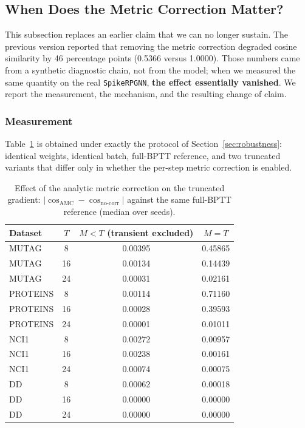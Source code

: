 \documentclass[a4paper,fleqn]{cas-dc}
\begin{document}
\subsection{When Does the Metric Correction Matter?}
\label{sec:when_mc_matters}

This subsection replaces an earlier claim that we can no longer sustain. The previous version reported that removing the metric correction degraded cosine similarity by 46 percentage points (0.5366 versus 1.0000). Those numbers came from a synthetic diagnostic chain, not from the model; when we measured the same quantity on the real \texttt{SpikeRPGNN}, \textbf{the effect essentially vanished}. We report the measurement, the mechanism, and the resulting change of claim.

\subsubsection{Measurement}

Table~\ref{tab:mc_ablation} is obtained under exactly the protocol of Section~\ref{sec:robustness}: identical weights, identical batch, full-BPTT reference, and two truncated variants that differ only in whether the per-step metric correction is enabled.

\begin{table}[htbp]
\caption{Effect of the analytic metric correction on the truncated gradient: $|\cos_{\text{AMC}}-\cos_{\text{no-corr}}|$ against the same full-BPTT reference (median over seeds).}
\label{tab:mc_ablation}
\centering\footnotesize
\begin{tabular}{@{}lccc@{}}
\toprule
Dataset & $T$ & $M<T$ (transient excluded) & $M=T$ \\
\midrule
MUTAG & 8 & 0.00395 & 0.45865 \\
MUTAG & 16 & 0.00134 & 0.14439 \\
MUTAG & 24 & 0.00031 & 0.02161 \\
PROTEINS & 8 & 0.00114 & 0.71160 \\
PROTEINS & 16 & 0.00028 & 0.39593 \\
PROTEINS & 24 & 0.00001 & 0.01011 \\
NCI1 & 8 & 0.00272 & 0.00957 \\
NCI1 & 16 & 0.00238 & 0.00161 \\
NCI1 & 24 & 0.00074 & 0.00075 \\
DD & 8 & 0.00062 & 0.00018 \\
DD & 16 & 0.00000 & 0.00000 \\
DD & 24 & 0.00000 & 0.00000 \\
\bottomrule
\end{tabular}
\end{table}
\end{document}
